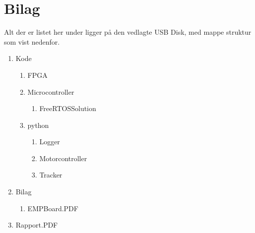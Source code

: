 \appendix
\section{Bilag} \hfill
Alt der er listet her under ligger på den vedlagte USB Disk, med mappe struktur som vist nedenfor.
\label{sec:bilag}
\begin{enumerate}[noitemsep]
	\item Kode
	\begin{enumerate}[noitemsep]
		\item FPGA
		\item Microcontroller
		\begin{enumerate}
			\item FreeRTOS\textunderscore Solution
		\end{enumerate}
		\item python
		\begin{enumerate}
			\item Logger
			\item Motorcontroller
			\item Tracker
		\end{enumerate}
	\end{enumerate}
	\item Bilag
	\begin{enumerate}[noitemsep]
		\item EMPBoard.PDF \label{itm:empboard}
	\end{enumerate}
	\item Rapport.PDF
\end{enumerate}
